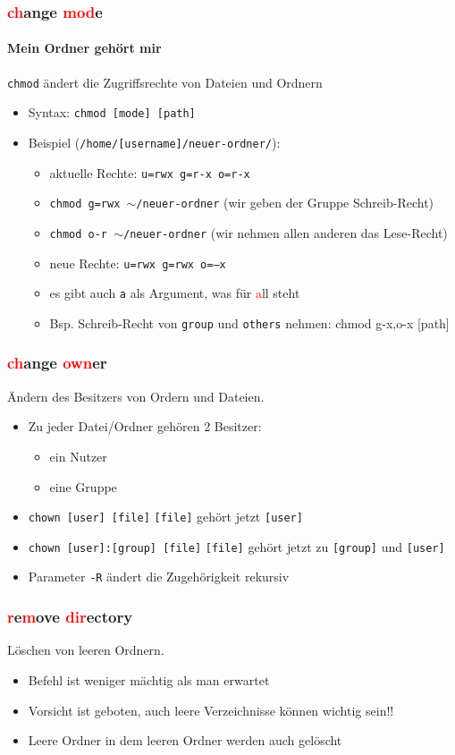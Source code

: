 \documentclass[12pt,utf8, handout]{beamer}
\begin{document}
\begin{frame}
\frametitle{\textcolor{red}{ch}ange \textcolor{red}{mod}e}
\framesubtitle{\textcolor{ownDarkOr}{Mein Ordner gehört mir}}
\texttt{chmod} ändert die Zugriffsrechte von Dateien und Ordnern
\begin{itemize}[<+->]
	\item Syntax: \texttt{chmod [mode] [path]}
	\item Beispiel (\texttt{/home/[username]/neuer-ordner/}):
	\begin{itemize}[<+->]
		\item aktuelle Rechte: \texttt{u=rwx g=r-x o=r-x}
		\item \texttt{chmod g=rwx $\sim$/neuer-ordner} (wir geben der Gruppe Schreib-Recht)
		\item \texttt{chmod o-r $\sim$/neuer-ordner} (wir nehmen allen anderen das Lese-Recht)
		\item neue Rechte: \texttt{u=rwx g=rwx o=--x}
		\item es gibt auch \texttt{a} als Argument, was für \textcolor{red}{a}ll steht
		\item Bsp. Schreib-Recht von \texttt{group} und \texttt{others} nehmen: chmod g-x,o-x [path] 	
	\end{itemize}
\end{itemize}
\end{frame}

\begin{frame}
\frametitle{\textcolor{red}{ch}ange \textcolor{red}{own}er}
Ändern des Besitzers von Ordern und Dateien.
\begin{itemize}
	\item Zu jeder Datei/Ordner gehören 2 Besitzer:
	\begin{itemize}[<+->]
		\item ein Nutzer
		\item eine Gruppe
	\end{itemize}
	\item \texttt{chown [user] [file]} \texttt{[file]} gehört jetzt \texttt{[user]}
	\item \texttt{chown [user]:[group] [file]} \texttt{[file]} gehört jetzt zu \texttt{[group]} und \texttt{[user]}
	\item Parameter \texttt{-R} ändert die Zugehörigkeit rekursiv
\end{itemize}
\end{frame}

\begin{frame}
\frametitle{\textcolor{red}{r}e\textcolor{red}{m}ove \textcolor{red}{dir}ectory}
Löschen von leeren Ordnern.
\begin{itemize}
	\item Befehl ist weniger mächtig als man erwartet
	\item Vorsicht ist geboten, auch leere Verzeichnisse können wichtig sein!!
	\item Leere Ordner in dem leeren Ordner werden auch gelöscht
\end{itemize}
\end{frame}
\end{document}
